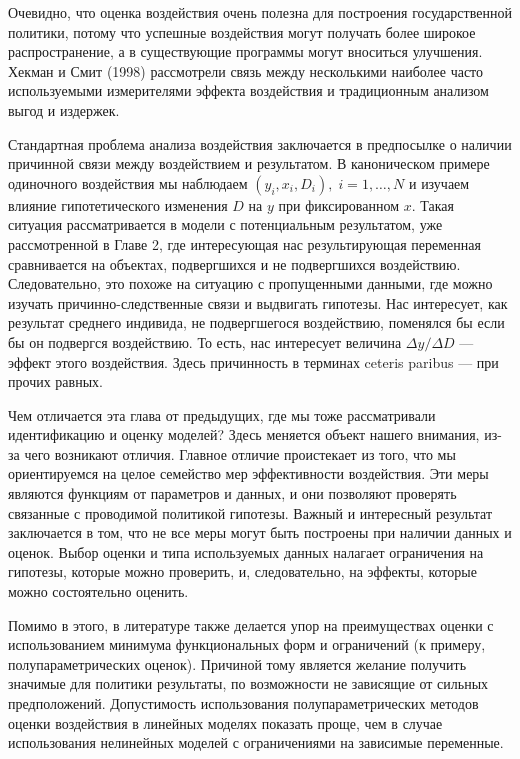 Очевидно, что оценка воздействия очень полезна для построения государственной политики, потому что успешные воздействия могут получать более широкое распространение, а в существующие программы могут вноситься улучшения. Хекман и Смит (1998) рассмотрели связь между несколькими наиболее часто используемыми измерителями эффекта воздействия и традиционным анализом выгод и издержек. 

Стандартная проблема анализа воздействия заключается в предпосылке о наличии причинной связи между воздействием и результатом. В каноническом примере одиночного воздействия мы наблюдаем $(y_i, x_i, D_i), \; i = 1, \dots, N$ и изучаем влияние гипотетического изменения $D$ на $y$ при фиксированном $x$. Такая ситуация рассматривается в модели с потенциальным результатом, уже рассмотренной в Главе 2, где интересующая нас результирующая переменная сравнивается на объектах, подвергшихся и не подвергшихся воздействию. Следовательно, это похоже на ситуацию с пропущенными данными, где можно изучать причинно-следственные связи и выдвигать гипотезы. Нас интересует, как результат среднего индивида, не подвергшегося воздействию, поменялся бы если бы он подвергся воздействию. То есть, нас интересует величина $\Delta y / \Delta D$ --- эффект этого воздействия. Здесь причинность в терминах ceteris paribus --- при прочих равных. 

Чем отличается эта глава от предыдущих, где мы тоже рассматривали идентификацию и оценку моделей? Здесь меняется объект нашего внимания, из-за чего возникают отличия. Главное отличие проистекает из того, что мы ориентируемся на целое семейство мер эффективности воздействия. Эти меры являются функциям от параметров и данных, и они позволяют проверять связанные с проводимой политикой гипотезы. Важный и интересный результат заключается в том, что не все меры могут быть построены при наличии данных и оценок. Выбор оценки и типа используемых данных налагает ограничения на гипотезы, которые можно проверить, и, следовательно, на эффекты, которые можно состоятельно оценить. 

Помимо в этого, в литературе также делается упор на преимуществах оценки с использованием минимума функциональных форм и ограничений (к примеру, полупараметрических оценок). Причиной тому является желание получить значимые для политики результаты, по возможности не зависящие от сильных предположений. Допустимость использования полупараметрических методов оценки воздействия в линейных моделях показать проще, чем в случае использования нелинейных моделей с ограничениями на зависимые переменные. 

